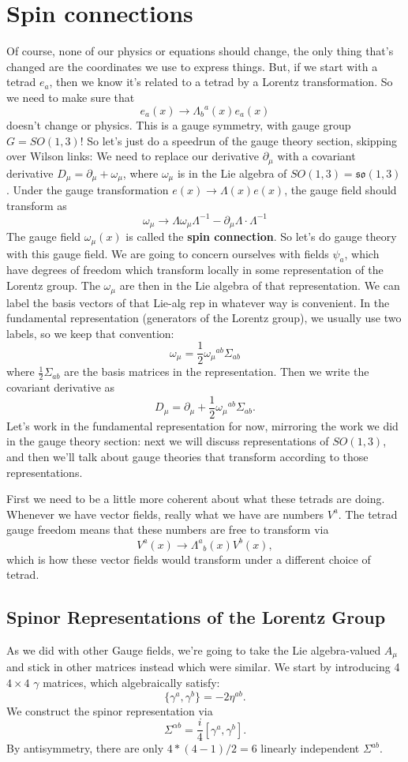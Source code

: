 \documentclass[main.tex]{subfiles}
\begin{document}
\section{Spin connections}
Of course, none of our physics or equations should change, the only thing that's changed are the coordinates we use to express things. But, if we start with a tetrad $e_a$, then we know it's related to a tetrad by a Lorentz transformation. So we need to make sure that
\[
e_a (x) \to {\Lambda_b}^{a} (x) e_a (x)
\]
doesn't change or physics. This is a gauge symmetry, with gauge group $G = SO(1,3)$! So let's just do a speedrun of the gauge theory section, skipping over Wilson links: We need to replace our derivative $\partial_\mu$ with a covariant derivative $D_\mu = \partial_\mu + \omega_\mu$, where $\omega_\mu$ is in the Lie algebra of $SO(1,3) = \mathfrak{so}(1,3)$. Under the gauge transformation $e(x) \to \Lambda(x) e(x)$, the gauge field should transform as
\[
\omega_\mu \to \Lambda \omega_\mu \Lambda^{-1} - \partial_\mu \Lambda \cdot \Lambda^{-1}
\]
The gauge field $\omega_\mu (x)$ is called the \textbf{spin connection}. So let's do gauge theory with this gauge field. We are going to concern ourselves with fields $\psi_a$, which have degrees of freedom which transform locally in some representation of the Lorentz group. The $\omega_\mu$ are then in the Lie algebra of that representation. We can label the basis vectors of that Lie-alg rep in whatever way is convenient. In the fundamental representation (generators of the Lorentz group), we usually use two labels, so we keep that convention:
\[
\omega_\mu = \frac{1}{2} {\omega_\mu}^{ab} \Sigma_{ab}
\]
where $\frac{1}{2} \Sigma_{ab}$ are the basis matrices in the representation. Then we write the covariant derivative as
\[
D_\mu = \partial_\mu + \frac{1}{2} {\omega_\mu}^{ab} \Sigma_{ab}.
\]
Let's work in the fundamental representation for now, mirroring the work we did in the gauge theory section: next we will discuss representations of $SO(1,3)$, and then we'll talk about gauge theories that transform according to those representations.

First we need to be a little more coherent about what these tetrads are doing. Whenever we have vector fields, really what we have are numbers $V^a$. The tetrad gauge freedom means that these numbers are free to transform via
\[
V^a (x) \to {\Lambda^a}_b (x) V^b (x),
\]
which is how these vector fields would transform under a different choice of tetrad. 

\newpage

\subsection{Spinor Representations of the Lorentz Group}
As we did with other Gauge fields, we're going to take the Lie algebra-valued $A_\mu$ and stick in other matrices instead which were similar. We start by introducing 4 $4 \times 4$ $\gamma$ matrices, which algebraically satisfy:
\[
\{\gamma^a,\gamma^b\} = -2\eta^{ab}.
\]
We construct the spinor representation via
\[
\Sigma^{\alpha b} = \frac{i}{4} [\gamma^a, \gamma^b].
\]
By antisymmetry, there are only $4*(4-1)/2 = 6$ linearly independent $\Sigma^{ab}$. 
\end{document}
